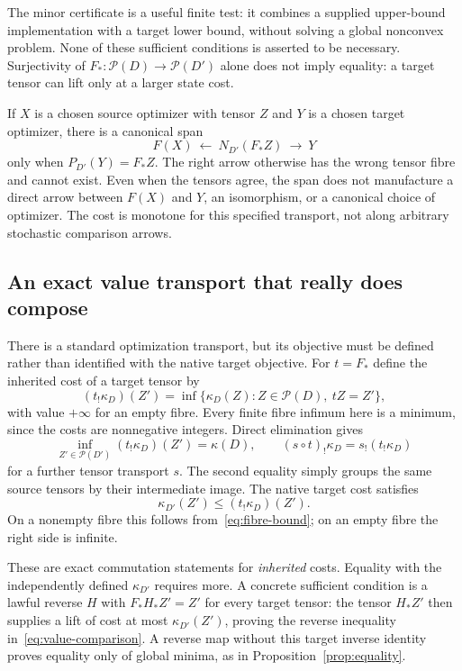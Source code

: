 \documentclass[11pt]{article}
\newcommand{\Pcal}{\mathcal P}
\theoremstyle{remark}
\begin{document}
The minor certificate is a useful finite test: it combines a supplied upper-bound implementation with a target lower bound, without solving a global nonconvex problem. None of these sufficient conditions is asserted to be necessary. Surjectivity of $F_*:\Pcal(D)\to\Pcal(D')$ alone does not imply equality: a target tensor can lift only at a larger state cost.

If $X$ is a chosen source optimizer with tensor $Z$ and $Y$ is a chosen target optimizer, there is a canonical span
\[
 F(X)\ \longleftarrow\ N_{D'}(F_*Z)\ \longrightarrow\ Y
\]
only when $P_{D'}(Y)=F_*Z$. The right arrow otherwise has the wrong tensor fibre and cannot exist. Even when the tensors agree, the span does not manufacture a direct arrow between $F(X)$ and $Y$, an isomorphism, or a canonical choice of optimizer. The cost is monotone for this specified transport, not along arbitrary stochastic comparison arrows.

\subsection{An exact value transport that really does compose}\label{sec:value-function}
There is a standard optimization transport, but its objective must be defined rather than identified with the native target objective. For $t=F_*$ define the inherited cost of a target tensor by
\begin{equation}\label{eq:inherited-cost}
 (t_!\kappa_D)(Z')=\inf\{\kappa_D(Z):Z\in\Pcal(D),\ tZ=Z'\},
\end{equation}
with value $+\infty$ for an empty fibre. Every finite fibre infimum here is a minimum, since the costs are nonnegative integers. Direct elimination gives
\begin{equation}\label{eq:value-identities}
 \inf_{Z'\in\Pcal(D')}(t_!\kappa_D)(Z')=\kappa(D),\qquad
 (s\circ t)_!\kappa_D=s_!(t_!\kappa_D)
\end{equation}
for a further tensor transport $s$. The second equality simply groups the same source tensors by their intermediate image. The native target cost satisfies
\begin{equation}\label{eq:value-comparison}
 \kappa_{D'}(Z')\le(t_!\kappa_D)(Z').
\end{equation}
On a nonempty fibre this follows from~\eqref{eq:fibre-bound}; on an empty fibre the right side is infinite.

These are exact commutation statements for \emph{inherited} costs. Equality with the independently defined $\kappa_{D'}$ requires more. A concrete sufficient condition is a lawful reverse $H$ with $F_*H_*Z'=Z'$ for every target tensor: the tensor $H_*Z'$ then supplies a lift of cost at most $\kappa_{D'}(Z')$, proving the reverse inequality in~\eqref{eq:value-comparison}. A reverse map without this target inverse identity proves equality only of global minima, as in Proposition~\ref{prop:equality}.
\end{document}
